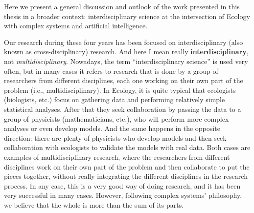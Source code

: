
Here we present a general discussion and outlook of the work presented in this
thesis in a broader context: interdisciplinary science at the intersection of
Ecology with complex systems and artificial intelligence.


Our research during these four years has been focused on interdisciplinary
(also known as cross-disciplinary) research. And here I mean really
\textbf{interdisciplinary}, not \textit{multidisciplinary}. Nowadays, the term
``interdisciplinary science'' is used very often, but in many cases it refers
to research that is done by a group of researchers from different disciplines,
each one working on their own part of the problem (i.e., multidisciplinary). In
Ecology, it is quite typical that ecologists (biologists, etc.) focus on
gathering data and performing relatively simple statistical analyses. After
that they seek collaboration by passing the data to a group of physicists
(mathematicians, etc.), who will perform more complex analyses or even develop
models. And the same happens in the opposite direction: there are plenty of
physicists who develop models and then seek collaboration with ecologists to
validate the models with real data. Both cases are examples of
multidisciplinary research, where the researchers from different disciplines
work on their own part of the problem and then collaborate to put the pieces
together, without really integrating the different disciplines in the research
process. In any case, this is a very good way of doing research, and it has
been very successful in many cases. However, following complex systems'
philosophy, we believe that the whole is more than the sum of its parts.

